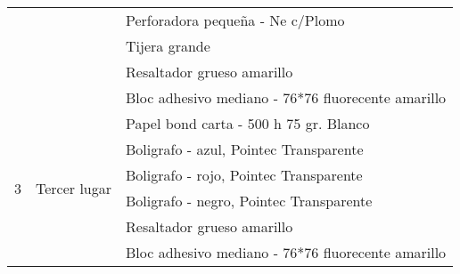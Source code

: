 \documentclass{article}
\begin{document}
\begin{table}[htbp]
{\begin{tabular}{|c|c|l|}
\cmidrule{3-3}          &       & Perforadora pequeña - Ne c/Plomo \\
\cmidrule{3-3}          &       & Tijera grande \\
\cmidrule{3-3}          &       & Resaltador grueso amarillo \\
\cmidrule{3-3}          &       & Bloc adhesivo mediano - 76*76 fluorecente amarillo \\
    \midrule
    \multirow{6}[12]{*}{3} & \multirow{6}[12]{*}{Tercer lugar} & Papel bond carta - 500 h 75 gr. Blanco \\
\cmidrule{3-3}          &       & Boligrafo - azul, Pointec Transparente \\
\cmidrule{3-3}          &       & Boligrafo - rojo, Pointec Transparente \\
\cmidrule{3-3}          &       & Boligrafo - negro, Pointec Transparente \\
\cmidrule{3-3}          &       & Resaltador grueso amarillo \\
\cmidrule{3-3}          &       & Bloc adhesivo mediano - 76*76 fluorecente amarillo \\
    \bottomrule
    \end{tabular}}%
  \label{tab:addlabel}%
\end{table}

\newpage



\newpage


\end{document}
